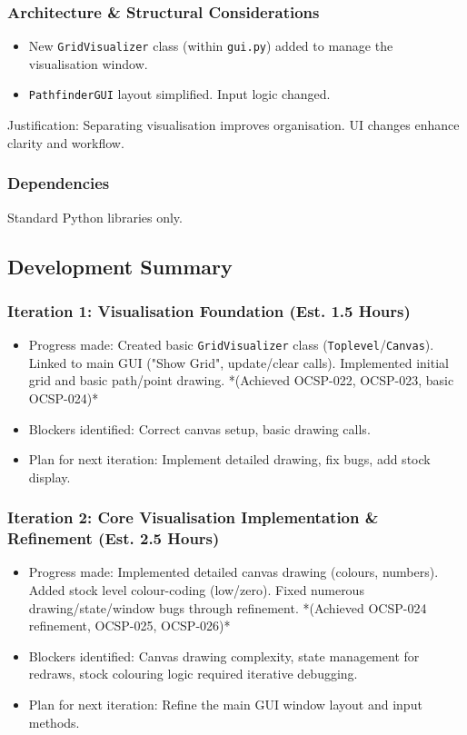 \subsubsection{Architecture \& Structural Considerations}
\begin{itemize}
	\item New \verb|GridVisualizer| class (within \verb|gui.py|) added to manage the visualisation window.
	\item \verb|PathfinderGUI| layout simplified. Input logic changed.
\end{itemize}
Justification: Separating visualisation improves organisation. UI changes enhance clarity and workflow.

\subsubsection{Dependencies}
Standard Python libraries only.

\newpage
\subsection{Development Summary}

\subsubsection{Iteration 1: Visualisation Foundation (Est. 1.5 Hours)}
\begin{itemize}
	\item Progress made: Created basic \verb|GridVisualizer| class (\verb|Toplevel|/\verb|Canvas|). Linked to main GUI ("Show Grid", update/clear calls). Implemented initial grid and basic path/point drawing. *(Achieved OCSP-022, OCSP-023, basic OCSP-024)*
	\item Blockers identified: Correct canvas setup, basic drawing calls.
	\item Plan for next iteration: Implement detailed drawing, fix bugs, add stock display.
\end{itemize}

\subsubsection{Iteration 2: Core Visualisation Implementation \& Refinement (Est. 2.5 Hours)}
\begin{itemize}
	\item Progress made: Implemented detailed canvas drawing (colours, numbers). Added stock level colour-coding (low/zero). Fixed numerous drawing/state/window bugs through refinement. *(Achieved OCSP-024 refinement, OCSP-025, OCSP-026)*
	\item Blockers identified: Canvas drawing complexity, state management for redraws, stock colouring logic required iterative debugging.
	\item Plan for next iteration: Refine the main GUI window layout and input methods.
\end{itemize}


